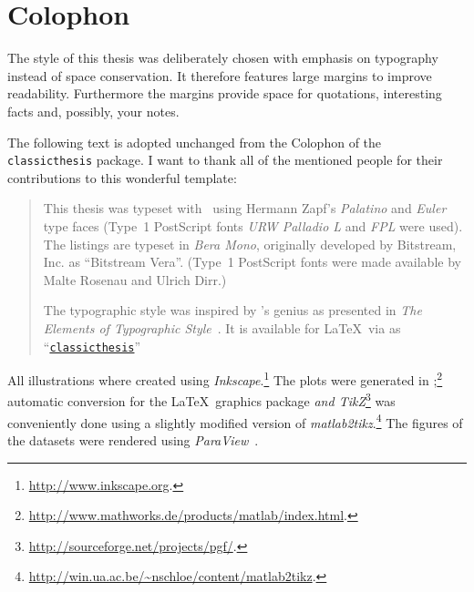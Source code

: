 \pagestyle{empty}

\hfill

\vfill


\section*{Colophon}
The style of this thesis was deliberately chosen with emphasis on typography instead of space conservation. It therefore features large margins to improve readability. Furthermore the margins provide space for quotations, interesting facts and, possibly, your notes.

The following text is adopted unchanged from the Colophon of the
{\texttt{classicthesis}} package. I want to thank all of the mentioned
people for their contributions to this wonderful template:

\begin{quotation}
This thesis was typeset with \LaTeXe\ using Hermann Zapf's \emph{Palatino}
and \emph{Euler} type faces (Type~1 PostScript fonts \emph{URW Palladio L}
and \emph{FPL} were used). The listings are typeset in \emph{Bera
Mono}, originally developed by Bitstream, Inc. as ``Bitstream Vera''.
(Type~1 PostScript fonts were made available by Malte Rosenau and
Ulrich Dirr.)

The typographic style was inspired by 's genius as
presented in \emph{The Elements of Typographic Style}~\citep{bringhurst:2002}. It is available for \LaTeX\ via  as 
``\href{http://www.ctan.org/tex-archive/macros/latex/contrib/classicthesis/}%
{\texttt{classicthesis}}''
\end{quotation}

All illustrations where created using \emph{Inkscape}.\footnote{\url{http://www.inkscape.org}.} The plots were generated in \emph{};\footnote{\url{http://www.mathworks.de/products/matlab/index.html}.} automatic conversion for the \LaTeX\ graphics package \emph{ and TikZ}\footnote{\url{http://sourceforge.net/projects/pgf/}.} was conveniently done using a slightly modified version of \emph{matlab2tikz}.\footnote{\url{http://win.ua.ac.be/~nschloe/content/matlab2tikz}.}
The \threeD figures of the datasets were rendered using \emph{ParaView}~\cite{ParaView}.

\bigskip
\noindent\finalVersionString



